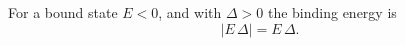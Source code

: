 \documentclass{article}
\begin{document}
For a bound state $E<0$, and with $\Delta>0$ the binding energy is
\begin{equation}
\left|E\,\Delta\right| = E\,\Delta .
\label{eq:w}
\end{equation}
\end{document}
